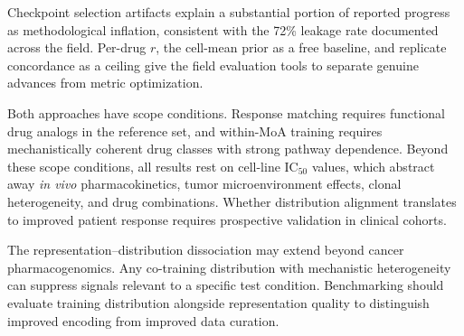 Checkpoint selection artifacts explain a substantial portion of reported progress as methodological inflation, consistent with the 72\% leakage rate documented across the field\cite{asiaee2026widespread}. Per-drug $r$, the cell-mean prior as a free baseline, and replicate concordance as a ceiling give the field evaluation tools to separate genuine advances from metric optimization.

Both approaches have scope conditions. Response matching requires functional drug analogs in the reference set, and within-MoA training requires mechanistically coherent drug classes with strong pathway dependence. Beyond these scope conditions, all results rest on cell-line IC$_{50}$ values, which abstract away \textit{in vivo} pharmacokinetics, tumor microenvironment effects, clonal heterogeneity, and drug combinations. Whether distribution alignment translates to improved patient response requires prospective validation in clinical cohorts.

The representation--distribution dissociation may extend beyond cancer pharmacogenomics. Any co-training distribution with mechanistic heterogeneity can suppress signals relevant to a specific test condition. Benchmarking should evaluate training distribution alongside representation quality to distinguish improved encoding from improved data curation.
